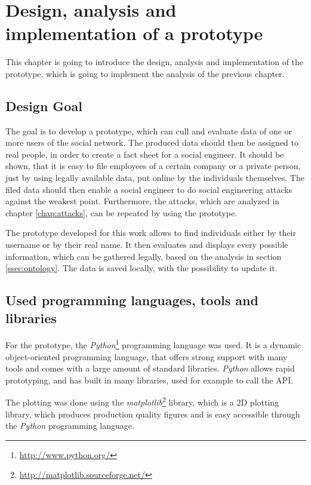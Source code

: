 \chapter{Design, analysis and implementation of a prototype}
\label{chap:prototype}

This chapter is going to introduce the design, analysis and implementation of
the prototype, which is going to implement the analysis of the previous
chapter.

\section{Design Goal}

The goal is to develop a prototype, which can cull and evaluate data of one or
more users of the \Twitter{} social network. The produced data should then be
assigned to real people, in order to create a fact sheet for a social engineer.
It should be shown, that it is easy to file employees of a certain company or a
private person, just by using legally available data, put online by the
individuals themselves. The filed data should then enable a social engineer to
do social engineering attacks against the weakest point. Furthermore, the
attacks, which are analyzed in chapter \ref{chap:attacks}, can be repeated by
using the prototype.

The prototype developed for this work allows to find individuals either by
their username or by their real name. It then evaluates and displays every
possible information, which can be gathered legally, based on the analysis in
section \ref{ssec:ontology}. The data is saved locally, with the possibility to
update it.

\section{Used programming languages, tools and libraries}

For the prototype, the \textit{Python}\footnote{\url{http://www.python.org/}}
programming language was used. It is a dynamic object-oriented programming
language, that offers strong support with many tools and comes with a large
amount of standard libraries. \textit{Python} allows rapid prototyping, and has
built in many libraries, used for example to call the \Twitter{} API.

The plotting was done using the
\textit{matplotlib}\footnote{\url{http://matplotlib.sourceforge.net/}} library,
which is a 2D plotting library, which produces production quality figures and
is easy accessible through the \textit{Python} programming language.

